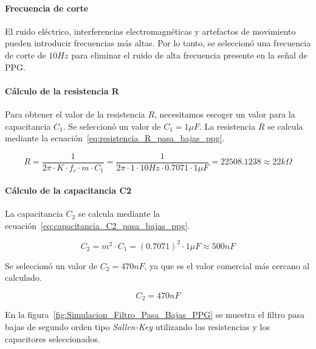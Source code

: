         \paragraph{Frecuencia de corte}
        El ruido eléctrico, interferencias electromagnéticas y artefactos de movimiento pueden introducir frecuencias más altas. Por lo tanto, se seleccionó una frecuencia de corte de $10 Hz$ para eliminar el ruido de alta frecuencia presente en la señal de PPG.

        \paragraph{Cálculo de la resistencia R}
        Para obtener el valor de la resistencia $R$, necesitamos escoger un valor para la capacitancia $C_1$. Se seleccionó un valor de $C_1 = 1 \mu F$. La resistencia $R$ se calcula mediante la ecuación~\ref{eq:resistencia_R_pasa_bajas_ppg}.

        \begin{equation}
            \label{eq:resistencia_R_pasa_bajas_ppg}
            R = \frac{1}{2\pi \cdot K \cdot f_c \cdot m \cdot C_1} = \frac{1}{2\pi \cdot 1 \cdot 10 Hz \cdot 0.7071 \cdot 1 \mu F} = 22508.1238 \approx 22 k\Omega
        \end{equation}

        \paragraph{Cálculo de la capacitancia C2}
        La capacitancia $C_2$ se calcula mediante la ecuación~\ref{eq:capacitancia_C2_pasa_bajas_ppg}.

        \begin{equation}
            \label{eq:capacitancia_C2_pasa_bajas_ppg}
            C_2 = m^2 \cdot C_1 = (0.7071)^2 \cdot 1 \mu F \approx 500 nF
        \end{equation}

        Se seleccionó un valor de $C_2 = 470 nF$, ya que es el valor comercial más cercano al calculado.

        \begin{equation}
            C_2 = 470 nF
        \end{equation}

        En la figura~\ref{fig:Simulacion_Filtro_Pasa_Bajas_PPG} se muestra el filtro pasa bajas de segundo orden tipo \textit{Sallen-Key} utilizando las resistencias y los capacitores seleccionados.

